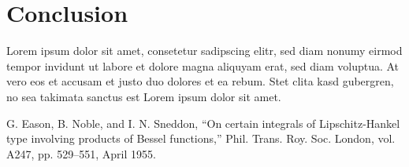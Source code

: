 \documentclass[conference]{IEEEtran}
\begin{document}
\section{Conclusion}\label{conclusion}

Lorem ipsum dolor sit amet, consetetur sadipscing elitr, sed diam nonumy
eirmod tempor invidunt ut labore et dolore magna aliquyam erat, sed diam
voluptua. At vero eos et accusam et justo duo dolores et ea rebum. Stet
clita kasd gubergren, no sea takimata sanctus est Lorem ipsum dolor sit
amet.


\begin{thebibliography}{00}
 G. Eason, B. Noble, and I. N. Sneddon, ``On certain integrals of Lipschitz-Hankel type involving products of Bessel functions,'' Phil. Trans. Roy. Soc. London, vol. A247, pp. 529--551, April 1955.
\end{thebibliography}
\end{document}
